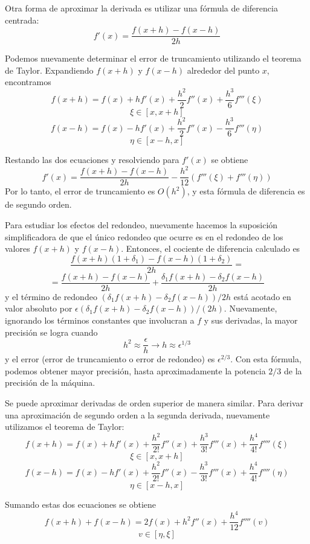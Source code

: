 Otra forma de aproximar la derivada es utilizar una fórmula de diferencia centrada:
\begin{equation}
    f'(x) = \frac{f(x + h) - f(x - h)}{2h}
    \label{Eq: (9.2)}
\end{equation}

Podemos nuevamente determinar el error de truncamiento utilizando el teorema de Taylor. Expandiendo $f(x + h)$ y $f(x - h)$ alrededor del punto $x$, encontramos
\[ f(x + h) = f(x) + h f'(x) + \frac{h^2}{2} f''(x) + \frac{h^3}{6} f'''(\xi) \]
\[ \xi \in [x, x+h] \]
\[ f(x - h) = f(x) - h f'(x) + \frac{h^2}{2} f''(x) - \frac{h^3}{6} f'''(\eta) \]
\[ \eta \in [x-h, x] \]

Restando las dos ecuaciones y resolviendo para $f'(x)$ se obtiene
\[ f'(x) = \frac{f(x + h) - f(x - h)}{2h} - \frac{h^2}{12} (f'''(\xi) + f'''(\eta)) \]
Por lo tanto, el error de truncamiento es $O(h^2)$, y esta fórmula de diferencia es de segundo orden.

Para estudiar los efectos del redondeo, nuevamente hacemos la suposición simplificadora de que el único redondeo que ocurre es en el redondeo de los valores $f(x + h)$ y $f(x - h)$. Entonces, el cociente de diferencia calculado es
\[ \frac{f(x + h) (1 + \delta_1) - f(x - h)(1 + \delta_2)}{2h} = \]
\[ = \frac{f(x + h) - f(x - h)}{2h} + \frac{\delta_1 f(x + h) - \delta_2 f(x - h)}{2h} \]
y el término de redondeo $(\delta_1 f(x + h) - \delta_2 f(x - h)) / 2h$ está acotado en valor absoluto por $\epsilon (\delta_1 f(x + h) - \delta_2 f(x - h)) / (2h)$. Nuevamente, ignorando los términos constantes que involucran a $f$ y sus derivadas, la mayor precisión se logra cuando
\[ h^2 \approx \frac{\epsilon}{h} \rightarrow h \approx \epsilon^{1/3} \]
y el error (error de truncamiento o error de redondeo) es $\epsilon^{2/3}$. Con esta fórmula, podemos obtener mayor precisión, hasta aproximadamente la potencia $2/3$ de la precisión de la máquina.

Se puede aproximar derivadas de orden superior de manera similar. Para derivar una aproximación de segundo orden a la segunda derivada, nuevamente utilizamos el teorema de Taylor:
\[ f(x + h)  = f(x) + h f'(x) + \frac{h^2}{2!} f''(x) + \frac{h^3}{3!} f'''(x) + \frac{h^4}{4!} f''''(\xi) \]
\[ \xi \in [x, x+h] \]
\[ f(x - h) = f(x) - h f'(x) + \frac{h^2}{2!} f''(x) - \frac{h^3}{3!} f'''(x) + \frac{h^4}{4!} f''''(\eta) \]
\[ \eta \in [x - h, x] \]

Sumando estas dos ecuaciones se obtiene
\[ f(x + h) + f(x - h) = 2 f(x) + h^2 f''(x) + \frac{h^4}{12} f''''(v) \]
\[ v \in [\eta, \xi] \]

